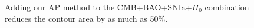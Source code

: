 \documentclass[iop]{emulateapj}
\begin{document}
\begin{figure}
{   %
   Adding our AP method to the CMB+BAO+SNIa+$H_0$ combination reduces the contour area by as much as 50\%. %
   }
\end{figure}
\end{document}

